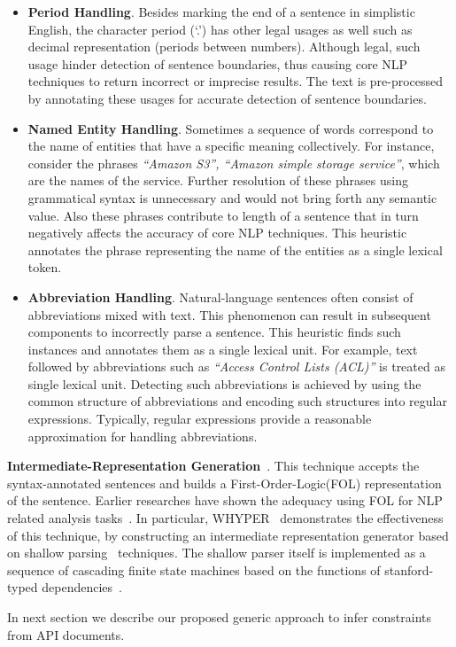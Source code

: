 \begin{itemize}

\item \textbf{Period Handling}. Besides marking the end of a sentence in simplistic English, the character period (`.') has other legal usages as well such as decimal representation (periods between numbers).
Although legal, such usage hinder detection of sentence boundaries, thus causing core NLP techniques to return incorrect or imprecise results.
The text is pre-processed by annotating these usages for accurate detection of sentence boundaries.
	
\item \textbf{Named Entity Handling}. Sometimes a sequence of words correspond to the name of entities that have a specific meaning collectively.
For instance, consider the phrases \textit{``Amazon S3'', ``Amazon simple storage service''}, which are the names of the service.
Further resolution of these phrases using grammatical syntax is unnecessary and would not bring forth any semantic value.
Also these phrases contribute to length of a sentence that in turn negatively affects the accuracy of core NLP techniques.
This heuristic annotates the phrase representing the name of the entities as a single lexical token.
	
\item \textbf{Abbreviation Handling}. Natural-language sentences often consist of abbreviations mixed with text.
This phenomenon can result in subsequent components to incorrectly parse a sentence.
This heuristic finds such instances and annotates them as a single lexical unit.
For example, text followed by abbreviations such as \textit{``Access Control Lists (ACL)''} is treated as single lexical unit.
Detecting such abbreviations is achieved by using the common structure of abbreviations and encoding such structures into regular expressions.
Typically, regular expressions provide a reasonable approximation for handling abbreviations.  

\end{itemize}

\textbf{Intermediate-Representation Generation}~\cite{pandita13:WHYPER}.
This technique accepts the syntax-annotated sentences and builds a First-Order-Logic(FOL) representation of the sentence.
Earlier researches have shown the adequacy using FOL for NLP related analysis tasks~\cite{Sinha2009,Sinha2010,pandita12:inferring}.
In particular, WHYPER~\cite{pandita13:WHYPER} demonstrates the effectiveness of this technique, by constructing an intermediate representation generator based on shallow parsing~\cite{Branimir2000} techniques. 
The shallow parser itself is implemented as a sequence of cascading finite state machines based on the functions of stanford-typed dependencies~\cite{Marneffe06LREC,Marneffe08COLING,Klein03,KleinNIPS03}.


In next section we describe our proposed generic approach to infer constraints from API documents. 